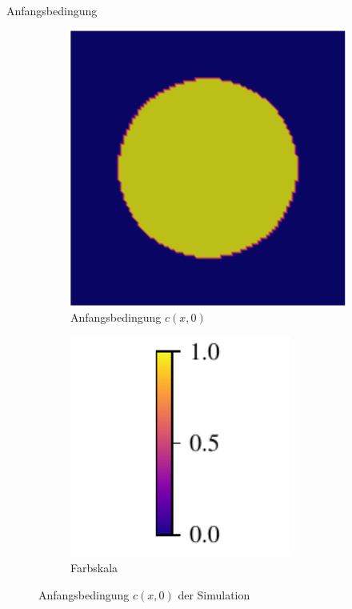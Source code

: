 \begin{frame}{Anfangsbedingung}
\begin{figure}
\centering
\begin{subfigure}{0.32\textwidth}
\centering
\includegraphics[width=\textwidth]{images/ach_sim/initial.pdf}
\caption{Anfangsbedingung $c(x,0)$}
\end{subfigure}
%
\begin{subfigure}{0.32\textwidth}
\centering
\includegraphics[width=0.8\textwidth]{images/colorbar}
\caption{Farbskala}
\end{subfigure}
\caption{Anfangsbedingung $c(x,0)$ der Simulation}
\end{figure}
\end{frame}


